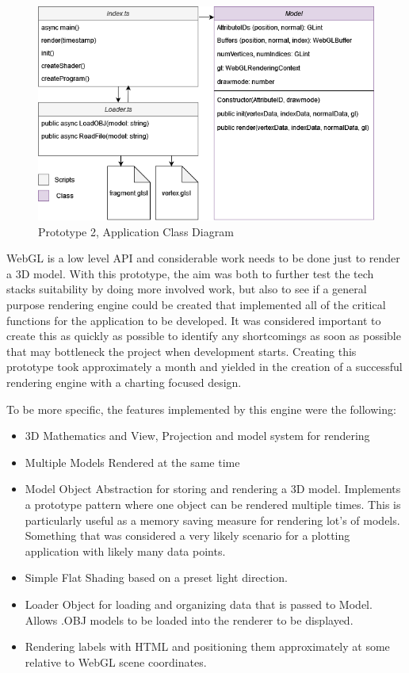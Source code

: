 \begin{figure}
    \centering
    \includegraphics[width=1\columnwidth]{author-files/figures/proto2.png}
    \caption{Prototype 2, Application Class Diagram}
    \label{fig:proto2class}
\end{figure}

\hfill

WebGL is a low level API and considerable work needs to be done just to render a 3D model. With this prototype, the aim was both to further test the tech stacks suitability by doing more involved work, but also to see if a general purpose rendering engine could be created that implemented all of the critical functions for the application to be developed. It was considered important to create this as quickly as possible to identify any shortcomings as soon as possible that may bottleneck the project when development starts. Creating this prototype took approximately a month and yielded in the creation of a successful rendering engine with a charting focused design.

To be more specific, the features implemented by this engine were the following:
\begin{itemize}
    \item 3D Mathematics and View, Projection and model system for rendering
    \item Multiple Models Rendered at the same time
    \item Model Object Abstraction for storing and rendering a 3D model. Implements a prototype pattern where one object can be rendered multiple times. This is particularly useful as a memory saving measure for rendering lot's of models. Something that was considered a very likely scenario for a plotting application with likely many data points.
    \item Simple Flat Shading based on a preset light direction.
    \item Loader Object for loading and organizing data that is passed to Model. Allows .OBJ models to be loaded into the renderer to be displayed.
    \item Rendering labels with HTML and positioning them approximately at some relative to WebGL scene coordinates.
\end{itemize}

